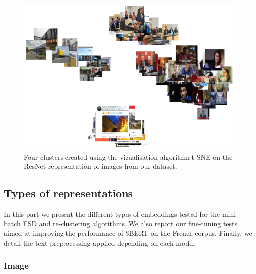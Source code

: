 \begin{figure}[ht]
  \centering
  \includegraphics[width=\linewidth]{figures/four_image_clusters.png}
  \caption{Four clusters created using the vizualisation algorithm t-SNE on the ResNet representation of images from our dataset.}
  \label{Fig:t-SNE}
\end{figure}

\subsection{Types of representations \label{SubSec: representations}}
In this part we present the different types of embeddings tested for the mini-batch FSD and re-clustering algorithms. We also report our fine-tuning tests aimed at improving the performance of SBERT on the French corpus. Finally, we detail the text preprocessing applied depending on each model.

\subsubsection{Image}

